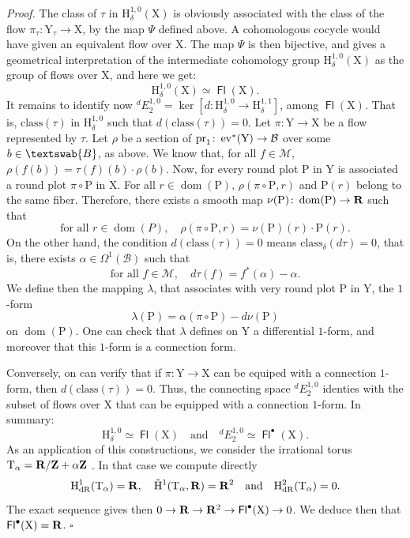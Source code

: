 \documentclass[12pt,reqno]{amsart}
\theoremstyle{article}
\renewenvironment{proof}{\noindent \textit{Proof.}} {\nolinebreak\hfill $\square$}
\def \H{\mathrm H}
\def \P{\mathrm P}
\def \T{\mathrm T}
\def \X{\mathrm X}
\def \Y{\mathrm Y}
\newcommand{\RR}{{\bf R}}
\newcommand{\ZZ}{{\bf Z}}
\newcommand{\cB}{{\mathcal B}}
\newcommand{\cM}{\mathcal{M}}
\newcommand{\fB}{\textswab{B}}
\newcommand{\class}{\mathrm{class}}
\DeclareMathOperator{\dom}{dom}
\newcommand{\dR}{\mathrm{dR}}
\DeclareMathOperator{\ev}{ev}
\DeclareMathOperator{\Fl}{\mathsf{Fl}}
\newcommand{\pr}{{\rm pr}}
\newcommand{\vH}{\check{\mathrm{H}}}
\def \H{\mathrm H}
\begin{document}
\begin{proof}
    The class of $\tau$ in $\H_\delta^{1,0}(\X)$ is obviously associated with the class of the flow $\pi_\tau \colon \Y_\tau \to \X$,
    by the map $\Psi$ defined above.
    A cohomologous cocycle would have given an equivalent flow over $\X$.
    The map $\Psi$ is then bijective,
    and gives a geometrical interpretation of the intermediate cohomology group $\H_\delta^{1,0}(\X)$ as the group of flows over $\X$,
    and here we get:
    $$
    \H_\delta^{1,0}(\X) \simeq \Fl(\X).
    $$
    It remains to identify now ${}^dE^{1,0}_2 = \ker[d \colon \H_\delta^{1,0} \to \H_\delta^{1,1}]$,
    among $\Fl(\X)$.
    That is,
    $\class(\tau)$ in $\H_\delta^{1,0}$ such that $d(\class(\tau))=0$.
    Let $\pi \colon \Y \to \X$ be a flow represented by $\tau$.
    Let $\rho$ be a section of $\pr_1 \colon \ev^*(\Y) \to \cB$ over some $b \in \fB$,
    as above.
    We know that,
    for all $f \in \cM$,
    $\rho(f(b)) = \tau(f)(b) \cdot \rho(b)$.
    Now,
    for every round plot $\P$ in $\Y$ is associated a round plot $\pi \circ \P$ in $\X$.
    For all $r \in \dom(\P)$,
    $\rho(\pi \circ \P,r)$ and $\P(r)$ belong to the same fiber.
    Therefore,
    there exists a smooth map $\nu(\P) \colon \dom(\P) \to \RR$ such that
    $$
    \text{for all } r \in \dom(P), \quad \rho(\pi \circ \P,r) = \nu(\P)(r) \cdot \P(r).
    $$
    On the other hand,
    the condition $d(\class(\tau))=0$ means $\class_\delta(d\tau)=0$,
    that is,
    there exists $\alpha \in \Omega^1(\cB)$ such that
    $$
    \text{for all } f \in \cM, \quad d\tau(f) = f^*(\alpha) - \alpha.
    $$
    We define then the mapping $\lambda$,
    that associates with very round plot $\P$ in $\Y$,
    the $1$-form
    $$
    \lambda(\P) = \alpha(\pi \circ \P) - d\nu(\P)
    $$
    on $\dom(\P)$.
    One can check that $\lambda$ defines on $\Y$ a differential $1$-form,
    and moreover that this $1$-form is a connection form.
    
    Conversely,
    on can verify that if $\pi \colon \Y \to \X$ can be equiped with a connection $1$-form,
    then $d(\class(\tau))=0$.
    Thus,
    the connecting space ${}^dE^{1,0}_2$ identies with the subset of flows over $\X$ that can be equipped with a connection $1$-form.
    In summary:
    $$
    \H_\delta^{1,0} \simeq \Fl(\X)
    \quad \text{and} \quad
    {}^dE^{1,0}_2 \simeq \Fl^\bullet(\X).
    $$
    As an application of this constructions,
    we consider the irrational torus $\T_\alpha = \RR/\ZZ + \alpha \ZZ$ \cite{DonIgl83}.
    In that case we compute directly
    $$
    \H_\dR^1(\T_\alpha) = \RR,
    \quad \vH^1(\T_\alpha,\RR) = \RR^2
    \quad\text{and}\quad
    \H_\dR^2(\T_\alpha) = 0.
    $$
    The exact sequence gives then $0 \to \RR \to \RR^2 \to \Fl^\bullet(\X) \to 0$.
    We deduce then that $\Fl^\bullet(\X) = \RR$.
  \end{proof}
  
\end{document}
